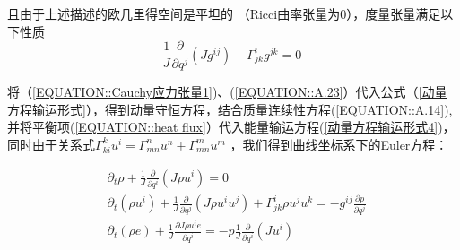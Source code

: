 \documentclass[LBMDerivation.tex]{subfiles}
\begin{document}
%
%

且由于上述描述的欧几里得空间是平坦的 （Ricci曲率张量为0），度量张量满足以下性质
\begin{equation}
  \frac{1}{J} \frac{\partial}{\partial q^{j}}\left(J g^{i j}\right)+\Gamma_{j k}^{i} g^{j k}=0
  \label{EQUATION::A.23} ~
\end{equation}
%
%


将（\ref{EQUATION::Cauchy应力张量1})、(\ref{EQUATION::A.23}）代入公式（\ref{动量方程输运形式}），得到动量守恒方程，结合质量连续性方程(\ref{EQUATION::A.14}), 并将平衡项(\ref{EQUATION::heat flux}）代入能量输运方程(\ref{动量方程输运形式4})，同时由于关系式$\Gamma_{ki}^k u^i = \Gamma_{mn}^n u^n + \Gamma_{mn}^m u^m$
，我们得到曲线坐标系下的Euler方程：





\begin{equation}
  \boxed{
    \begin{aligned}
       & \partial_{t} \rho+\frac{1}{J} \frac{\partial}{\partial q^{i}}\left(J \rho u^{i}\right)=0
      \\
       & \partial_{t}\left(\rho u^{i}\right)+\frac{1}{J} \frac{\partial}{\partial q^{j}}\left(J \rho u^{i} u^{j}\right)+\Gamma_{j k}^{i} \rho u^{j} u^{k}=-g^{i j} \frac{\partial p}{\partial q^{j}} \\
       & \partial_{t}\left(\rho e\right) + \frac{1}{J}\frac{\partial J \rho u^i e}{\partial  q^{i}} = -  p \frac{1}{J}  \frac{\partial}{\partial q^{i}}( J u^i)  \\
    \end{aligned}
  }
  \label{EQUATION::Eluer} ~
\end{equation}
%
%
\end{document}
